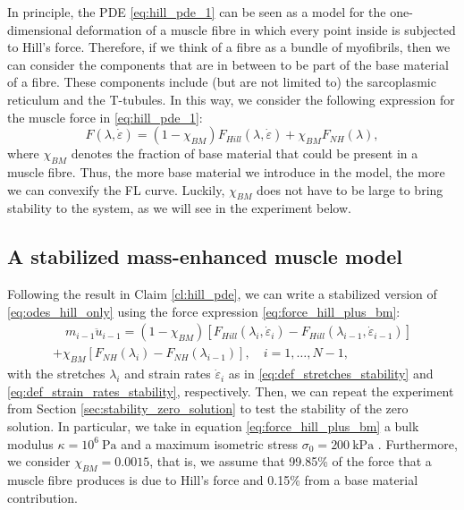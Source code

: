 \documentclass{sfuthesis}
\numberwithin{equation}{section}
\numberwithin{figure}{chapter}
\numberwithin{table}{chapter}
\theoremstyle{definition}
\newcommand{\depsilon}{\dot{\varepsilon}}
\begin{document}
In principle, the PDE \eqref{eq:hill_pde_1} can be seen as a model for the one-dimensional deformation of a muscle fibre in which every point inside is subjected to Hill's force. Therefore, if we think of a fibre as a bundle of myofibrils, then we can consider the components that are in between to be part of the base material of a fibre. These components include (but are not limited to) the sarcoplasmic reticulum and the T-tubules. In this way, we consider the following expression for the muscle force in \eqref{eq:hill_pde_1}:
\begin{equation} \label{eq:force_hill_plus_bm}
    F(\lambda, \depsilon) = (1-\chi_{BM}) F_{Hill}(\lambda, \depsilon) + \chi_{BM} F_{NH}(\lambda),
\end{equation}
where $\chi_{BM}$ denotes the fraction of base material that could be present in a muscle fibre. Thus, the more base material we introduce in the model, the more we can convexify the FL curve. Luckily, $\chi_{BM}$ does not have to be large to bring stability to the system, as we will see in the experiment below.

\subsection{A stabilized mass-enhanced muscle model} \label{sec:stabilized_muscle_model_1d}

Following the result in Claim \ref{cl:hill_pde}, we can write a stabilized version of \eqref{eq:odes_hill_only} using the force expression \eqref{eq:force_hill_plus_bm}:
\begin{multline} \label{eq:odes_hill_stabilized}
    \quad m_{i-1} \ddot{u}_{i-1} =
    (1-\chi_{BM})\left[ F_{Hill}(\lambda_i, \depsilon_i) - F_{Hill}(\lambda_{i-1}, \depsilon_{i-1}) \right] \\ 
    + \chi_{BM}\left[ F_{NH}(\lambda_i) - F_{NH}(\lambda_{i-1}) \right], \quad i = 1,\dots,N-1, \quad 
\end{multline}
with the stretches $\lambda_i$ and strain rates $\depsilon_i$ as in \eqref{eq:def_stretches_stability} and \eqref{eq:def_strain_rates_stability}, respectively. Then, we can repeat the experiment from Section \ref{sec:stability_zero_solution} to test the stability of the zero solution. In particular, we take in equation \eqref{eq:force_hill_plus_bm} a bulk modulus $\kappa = 10^6 \ \text{Pa}$ and a maximum isometric stress $\sigma_0 = 200 \ \text{kPa}$ \cite{AlmonacidEtAl2022_SIAP_Paper}. Furthermore, we consider $\chi_{BM} = 0.0015$, that is, we assume that 99.85\% of the force that a muscle fibre produces is due to Hill's force and 0.15\% from a base material contribution. 
\end{document}
